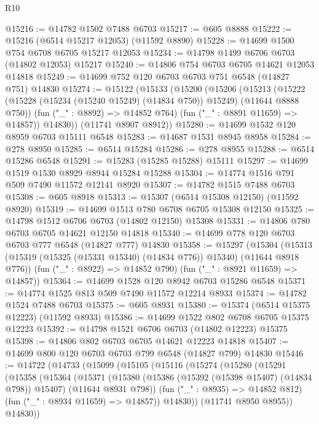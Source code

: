 \begin{lexlean}{R10}
\begin{coremodule}
@15216 := @14782 @1502 @7488 @6703
@15217 := @605 @8888
@15222 := @15216 (@6514 @15217 @12053) (@11592 @8890)
@15228 := @14699 @1500 @754 @6708 @6705 @15217 @12053
@15234 := @14798 @1499 @6706 @6703 (@14802 @12053) @15217
@15240 := @14806 @754 @6703 @6705 @14621 @12053 @14818
@15249 := @14699 @752 @120 @6703 @6703 @751 @6548 (@14827 @751) @14830
@15274 := @15122
    (@15133
      (@15200
        (@15206
          (@15213
            (@15222 (@15228 (@15234 (@15240 @15249) (@14834 @750)) @15249) (@11644 @8888 @750))
            (fun ("_" : @8892) => @14852 @764)
            (fun ("_" : @8891 @11659) => @14857))
          @14830))
      (@11741 @8907 @8912))
@15280 := @14699 @1532 @120 @8959 @6703 @15111 @6548
@15283 := @14687 @1531 @8945 @8958
@15284 := @278 @8950
@15285 := @6514 @15284
@15286 := @278 @8955
@15288 := @6514 @15286 @6548
@15291 := @15283 (@15285 @15288) @15111
@15297 := @14699 @1519 @1530 @8929 @8944 @15284 @15288
@15304 := @14774 @1516 @791 @509 @7490 @11572 @12141 @8920
@15307 := @14782 @1515 @7488 @6703
@15308 := @605 @8918
@15313 := @15307 (@6514 @15308 @12150) (@11592 @8920)
@15319 := @14699 @1513 @780 @6708 @6705 @15308 @12150
@15325 := @14798 @1512 @6706 @6703 (@14802 @12150) @15308
@15331 := @14806 @780 @6703 @6705 @14621 @12150 @14818
@15340 := @14699 @778 @120 @6703 @6703 @777 @6548 (@14827 @777) @14830
@15358 := @15297
    (@15304
      (@15313 (@15319 (@15325 (@15331 @15340) (@14834 @776)) @15340) (@11644 @8918 @776))
      (fun ("_" : @8922) => @14852 @790)
      (fun ("_" : @8921 @11659) => @14857))
@15364 := @14699 @1528 @120 @8942 @6703 @15286 @6548
@15371 := @14774 @1525 @813 @509 @7490 @11572 @12214 @8933
@15374 := @14782 @1524 @7488 @6703
@15375 := @605 @8931
@15380 := @15374 (@6514 @15375 @12223) (@11592 @8933)
@15386 := @14699 @1522 @802 @6708 @6705 @15375 @12223
@15392 := @14798 @1521 @6706 @6703 (@14802 @12223) @15375
@15398 := @14806 @802 @6703 @6705 @14621 @12223 @14818
@15407 := @14699 @800 @120 @6703 @6703 @799 @6548 (@14827 @799) @14830
@15446 := @14722
    (@14733
      (@15099
        (@15105
          (@15116
            (@15274
              (@15280
                (@15291
                  (@15358
                    (@15364
                      (@15371
                        (@15380
                          (@15386 (@15392 (@15398 @15407) (@14834 @798)) @15407)
                          (@11644 @8931 @798))
                        (fun ("_" : @8935) => @14852 @812)
                        (fun ("_" : @8934 @11659) => @14857))
                      @14830))
                  (@11741 @8950 @8955))
                @14830))

\end{coremodule}
\end{lexlean}
